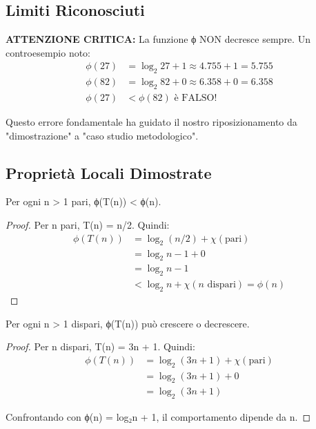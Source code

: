 \documentclass[11pt,a4paper]{article}
\begin{document}
\subsection{Limiti Riconosciuti}

\textbf{ATTENZIONE CRITICA:} La funzione ϕ NON decresce sempre. Un controesempio noto:
\begin{align}
\phi(27) &= \log_2 27 + 1 \approx 4.755 + 1 = 5.755 \\
\phi(82) &= \log_2 82 + 0 \approx 6.358 + 0 = 6.358 \\
\phi(27) &< \phi(82) \text{ è FALSO!}
\end{align}

Questo errore fondamentale ha guidato il nostro riposizionamento da "dimostrazione" a "caso studio metodologico".

\subsection{Proprietà Locali Dimostrate}

\begin{theorem}
Per ogni n > 1 pari, ϕ(T(n)) < ϕ(n).
\end{theorem}

\begin{proof}
Per n pari, T(n) = n/2. Quindi:
\begin{align}
\phi(T(n)) &= \log_2(n/2) + \chi(\text{pari}) \\
&= \log_2 n - 1 + 0 \\
&= \log_2 n - 1 \\
&< \log_2 n + \chi(n \text{ dispari}) = \phi(n)
\end{align}
\end{proof}

\begin{theorem}
Per ogni n > 1 dispari, ϕ(T(n)) può crescere o decrescere.
\end{theorem}

\begin{proof}
Per n dispari, T(n) = 3n + 1. Quindi:
\begin{align}
\phi(T(n)) &= \log_2(3n + 1) + \chi(\text{pari}) \\
&= \log_2(3n + 1) + 0 \\
&= \log_2(3n + 1)
\end{align}

Confrontando con ϕ(n) = log₂n + 1, il comportamento dipende da n.
\end{proof}
\end{document}
